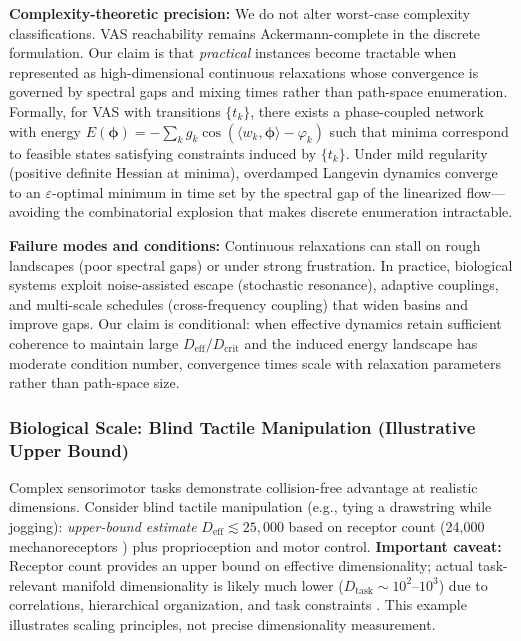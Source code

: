 \documentclass[12pt]{article}
\begin{document}
\textbf{Complexity-theoretic precision:} We do not alter worst-case complexity classifications. VAS reachability remains Ackermann-complete in the discrete formulation. Our claim is that \textit{practical} instances become tractable when represented as high-dimensional continuous relaxations whose convergence is governed by spectral gaps and mixing times rather than path-space enumeration. Formally, for VAS with transitions $\{t_k\}$, there exists a phase-coupled network with energy $E(\boldsymbol{\phi}) = -\sum_k g_k \cos(\langle w_k, \boldsymbol{\phi} \rangle - \varphi_k)$ such that minima correspond to feasible states satisfying constraints induced by $\{t_k\}$. Under mild regularity (positive definite Hessian at minima), overdamped Langevin dynamics converge to an $\varepsilon$-optimal minimum in time set by the spectral gap of the linearized flow---avoiding the combinatorial explosion that makes discrete enumeration intractable.

\textbf{Failure modes and conditions:} Continuous relaxations can stall on rough landscapes (poor spectral gaps) or under strong frustration. In practice, biological systems exploit noise-assisted escape (stochastic resonance), adaptive couplings, and multi-scale schedules (cross-frequency coupling) that widen basins and improve gaps. Our claim is conditional: when effective dynamics retain sufficient coherence to maintain large $D_{\text{eff}}/D_{\text{crit}}$ and the induced energy landscape has moderate condition number, convergence times scale with relaxation parameters rather than path-space size.

\subsubsection{Biological Scale: Blind Tactile Manipulation (Illustrative Upper Bound)}

Complex sensorimotor tasks demonstrate collision-free advantage at realistic dimensions. Consider blind tactile manipulation (e.g., tying a drawstring while jogging): \textit{upper-bound estimate} $D_{\text{eff}} \lesssim 25,000$ based on receptor count (24,000 mechanoreceptors \cite{johansson1998}) plus proprioception and motor control. \textbf{Important caveat:} Receptor count provides an upper bound on effective dimensionality; actual task-relevant manifold dimensionality is likely much lower ($D_{\text{task}} \sim 10^2$--$10^3$) due to correlations, hierarchical organization, and task constraints \cite{gallego2017,sadtler2014}. This example illustrates scaling principles, not precise dimensionality measurement.
\end{document}
